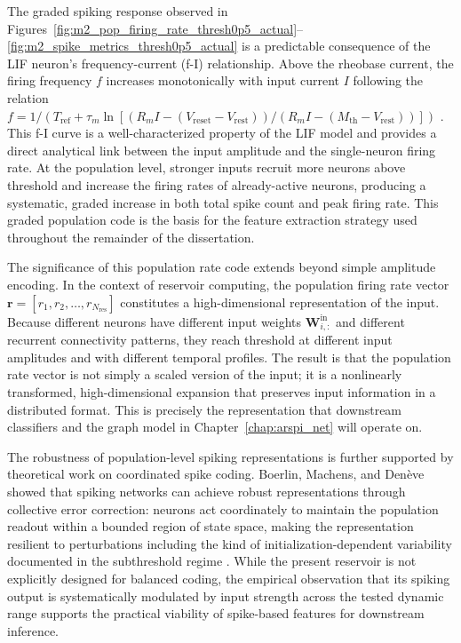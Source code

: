 The graded spiking response observed in Figures~\ref{fig:m2_pop_firing_rate_thresh0p5_actual}--\ref{fig:m2_spike_metrics_thresh0p5_actual} is a predictable consequence of the LIF neuron's frequency-current (f-I) relationship. Above the rheobase current, the firing frequency $f$ increases monotonically with input current $I$ following the relation $f = 1/(T_{\text{ref}} + \tau_m \ln[(R_m I - (V_{\text{reset}} - V_{\text{rest}}))/(R_m I - (M_{\text{th}} - V_{\text{rest}}))])$ \cite{gerstner_spiking_2002, dayan2001}. This f-I curve is a well-characterized property of the LIF model and provides a direct analytical link between the input amplitude and the single-neuron firing rate. At the population level, stronger inputs recruit more neurons above threshold and increase the firing rates of already-active neurons, producing a systematic, graded increase in both total spike count and peak firing rate. This graded population code is the basis for the feature extraction strategy used throughout the remainder of the dissertation.

The significance of this population rate code extends beyond simple amplitude encoding. In the context of reservoir computing, the population firing rate vector $\mathbf{r} = [r_1, r_2, \ldots, r_{N_{\text{res}}}]$ constitutes a high-dimensional representation of the input. Because different neurons have different input weights $\mathbf{W}^{\text{in}}_{i,:}$ and different recurrent connectivity patterns, they reach threshold at different input amplitudes and with different temporal profiles. The result is that the population rate vector is not simply a scaled version of the input; it is a nonlinearly transformed, high-dimensional expansion that preserves input information in a distributed format. This is precisely the representation that downstream classifiers and the graph model in Chapter~\ref{chap:arspi_net} will operate on.

The robustness of population-level spiking representations is further supported by theoretical work on coordinated spike coding. Boerlin, Machens, and Denève showed that spiking networks can achieve robust representations through collective error correction: neurons act coordinately to maintain the population readout within a bounded region of state space, making the representation resilient to perturbations including the kind of initialization-dependent variability documented in the subthreshold regime \cite{Boerlin2013_PredictiveCoding}. While the present reservoir is not explicitly designed for balanced coding, the empirical observation that its spiking output is systematically modulated by input strength across the tested dynamic range supports the practical viability of spike-based features for downstream inference.

